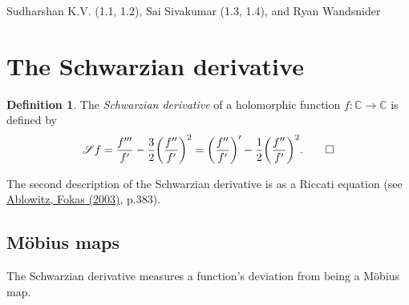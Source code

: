 \documentclass[11pt,leqno]{article}
\theoremstyle{plain}
\theoremstyle{definition}
\newtheorem{definition/}[lem]{Definition}
\newenvironment{definition}
  {\renewcommand{\qedsymbol}{\textdagger}%
   \pushQED{\qed}\begin{definition/}}
  {\popQED\end{definition/}}
\numberwithin{equation}{section}
\numberwithin{lem}{section}
\begin{document}
Sudharshan K.V. (1.1, 1.2), Sai Sivakumar (1.3, 1.4), and Ryan Wandsnider

\section{The Schwarzian derivative}
\begin{definition}
    The \textit{Schwarzian derivative} of a holomorphic function $f\colon \mathbb C\to \mathbb C$ is defined by
    \[\mathscr Sf = \frac{f^{\prime\prime\prime}}{f^\prime}-\frac{3}{2}\biggl(\frac{f^{\prime\prime}}{f^\prime}\biggr)^2 = \biggl(\frac{f^{\prime\prime}}{f^\prime}\biggr)^\prime - \frac{1}{2}\biggl(\frac{f^{\prime\prime}}{f^\prime}\biggr)^2.\qedhere\]
\end{definition}
The second description of the Schwarzian derivative is as a Riccati equation (see \href{https://ftfsite.ru/wp-content/files/tfkp_endlish_2.2.pdf}{Ablowitz, Fokas (2003)}, p.383).
\subsection{M\"obius maps}
The Schwarzian derivative measures a function's deviation from being a M\"obius map.
\end{document}
